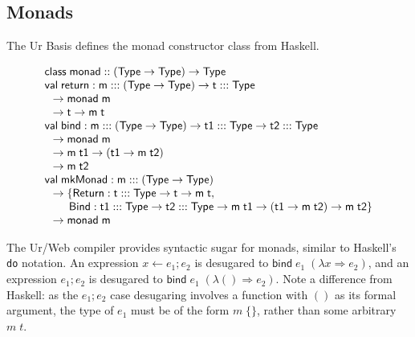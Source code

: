 \documentclass{article}
\newcommand{\cd}[1]{\texttt{#1}}
\newcommand{\mt}[1]{\mathsf{#1}}
\begin{document}
\subsection{Monads}

The Ur Basis defines the monad constructor class from Haskell.

$$\begin{array}{l}
  \mt{class} \; \mt{monad} :: (\mt{Type} \to \mt{Type}) \to \mt{Type} \\
  \mt{val} \; \mt{return} : \mt{m} ::: (\mt{Type} \to \mt{Type}) \to \mt{t} ::: \mt{Type} \\
  \hspace{.1in} \to \mt{monad} \; \mt{m} \\
  \hspace{.1in} \to \mt{t} \to \mt{m} \; \mt{t} \\
  \mt{val} \; \mt{bind} : \mt{m} ::: (\mt{Type} \to \mt{Type}) \to \mt{t1} ::: \mt{Type} \to \mt{t2} ::: \mt{Type} \\
  \hspace{.1in} \to \mt{monad} \; \mt{m} \\
  \hspace{.1in} \to \mt{m} \; \mt{t1} \to (\mt{t1} \to \mt{m} \; \mt{t2}) \\
  \hspace{.1in} \to \mt{m} \; \mt{t2} \\
  \mt{val} \; \mt{mkMonad} : \mt{m} ::: (\mt{Type} \to \mt{Type}) \\
  \hspace{.1in} \to \{\mt{Return} : \mt{t} ::: \mt{Type} \to \mt{t} \to \mt{m} \; \mt{t}, \\
  \hspace{.3in} \mt{Bind} : \mt{t1} ::: \mt{Type} \to \mt{t2} ::: \mt{Type} \to \mt{m} \; \mt{t1} \to (\mt{t1} \to \mt{m} \; \mt{t2}) \to \mt{m} \; \mt{t2}\} \\
  \hspace{.1in} \to \mt{monad} \; \mt{m}
\end{array}$$

The Ur/Web compiler provides syntactic sugar for monads, similar to Haskell's \cd{do} notation.  An expression $x \leftarrow e_1; e_2$ is desugared to $\mt{bind} \; e_1 \; (\lambda x \Rightarrow e_2)$, and an expression $e_1; e_2$ is desugared to $\mt{bind} \; e_1 \; (\lambda () \Rightarrow e_2)$.  Note a difference from Haskell: as the $e_1; e_2$ case desugaring involves a function with $()$ as its formal argument, the type of $e_1$ must be of the form $m \; \{\}$, rather than some arbitrary $m \; t$.
\end{document}
